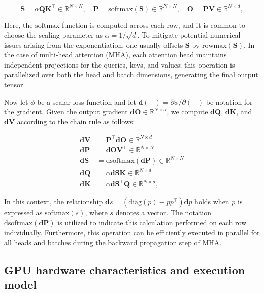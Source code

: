 \begin{enumerate}
\begin{equation*}
  \mathbf{S} = \alpha \mathbf{Q} \mathbf{K}^\top \in \mathbb{R}^{N \times N}, \quad \mathbf{P} = \mathrm{softmax}(\mathbf{S}) \in \mathbb{R}^{N \times N}, \quad \mathbf{O} = \mathbf{P}\mathbf{V} \in \mathbb{R}^{N \times d},
\end{equation*}

Here, the $\mathrm{softmax}$ function is computed across each row, and it is common to choose the scaling parameter as $\alpha = 1/\sqrt{d}$. To mitigate potential numerical issues arising from the exponentiation, one usually offsets $\mathbf{S}$ by $\mathrm{rowmax}(\mathbf{S})$. In the case of multi-head attention (MHA), each attention head maintains independent projections for the queries, keys, and values; this operation is parallelized over both the head and batch dimensions, generating the final output tensor.

Now let $\phi$ be a scalar loss function and let $\mathbf{d}(-) = \partial \phi / \partial (-)$ be notation for the gradient. Given the output gradient $\mathbf{dO} \in \mathbb{R}^{N \times d}$, we compute $\mathbf{dQ}$, $\mathbf{dK}$, and $\mathbf{dV}$ according to the chain rule as follows:

\begin{align*}
  \mathbf{dV} &= \mathbf{P}^\top \mathbf{dO} \in \mathbb{R}^{N \times d} \\
  \mathbf{dP} &= \mathbf{dO} \mathbf{V}^\top \in \mathbb{R}^{N \times N} \\
  \mathbf{dS} &= \mathrm{dsoftmax} (\mathbf{dP}) \in \mathbb{R}^{N \times N} \\
  \mathbf{dQ} &= \alpha \mathbf{dS} \mathbf{K} \in \mathbb{R}^{N \times d} \\
  \mathbf{dK} &= \alpha \mathbf{dS}^\top \mathbf{Q} \in \mathbb{R}^{N \times d},
\end{align*}

In this context, the relationship $\mathbf{d}s = (\mathrm{diag}(p) - p p^\top)\mathbf{d}p$ holds when $p$ is expressed as $\mathrm{softmax}(s)$, where $s$ denotes a vector. The notation $\mathrm{dsoftmax}(\mathbf{dP})$ is utilized to indicate this calculation performed on each row individually. Furthermore, this operation can be efficiently executed in parallel for all heads and batches during the backward propagation step of MHA.

\subsection{GPU hardware characteristics and execution model}
\label{subsec:hardware}


\end{enumerate}
